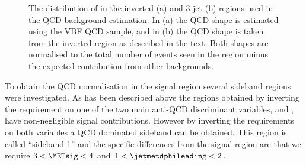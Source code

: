\begin{figure}
  \caption{The distribution of \METsig in the inverted (a) and 3-jet (b) regions used in the \ac{QCD} background estimation. In (a) the \ac{QCD} shape is estimated using the \ac{VBF} \ac{QCD} sample, and in (b) the \ac{QCD} shape is taken from the inverted region as described in the text. Both shapes are normalised to the total number of events seen in the region minus the expected contribution from other backgrounds.}
  \label{fig:parkeddataqcd}
\end{figure}

To obtain the \ac{QCD} normalisation in the signal region several sideband regions were investigated. As has been described above the regions obtained by inverting the requirement on one of the two main anti-\ac{QCD} discriminant variables, \jetmetdphi and \METsig, have non-negligible signal contributions. However by inverting the requirements on both variables a \ac{QCD} dominated sideband can be obtained. This region is called ``sideband 1'' and the specific differences from the signal region are that we require $3<\METsig<4$ and $1<\jetmetdphileading<2$.  

